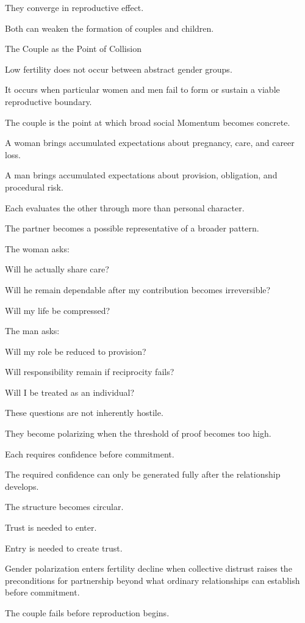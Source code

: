 They converge in reproductive effect.

Both can weaken the formation of couples and children.

The Couple as the Point of Collision

Low fertility does not occur between abstract gender groups.

It occurs when particular women and men fail to form or sustain a viable reproductive boundary.

The couple is the point at which broad social Momentum becomes concrete.

A woman brings accumulated expectations about pregnancy, care, and career loss.

A man brings accumulated expectations about provision, obligation, and procedural risk.

Each evaluates the other through more than personal character.

The partner becomes a possible representative of a broader pattern.

The woman asks:

Will he actually share care?

Will he remain dependable after my contribution becomes irreversible?

Will my life be compressed?

The man asks:

Will my role be reduced to provision?

Will responsibility remain if reciprocity fails?

Will I be treated as an individual?

These questions are not inherently hostile.

They become polarizing when the threshold of proof becomes too high.

Each requires confidence before commitment.

The required confidence can only be generated fully after the relationship develops.

The structure becomes circular.

Trust is needed to enter.

Entry is needed to create trust.

Gender polarization enters fertility decline when collective distrust raises the preconditions for partnership beyond what ordinary relationships can establish before commitment.

The couple fails before reproduction begins.

